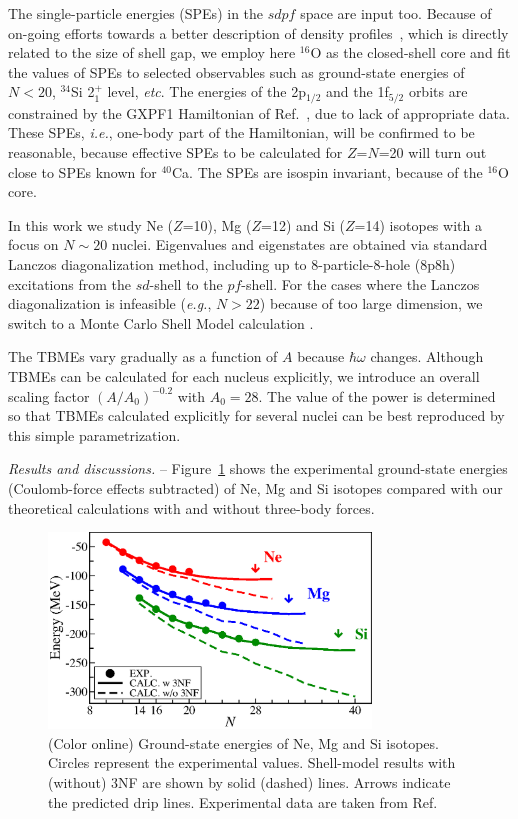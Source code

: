 \documentclass[aps,prl,twocolumn,groupedaddress,showkeys,showpacs,floatfix,superscriptaddress]{revtex4-1}
\newcommand\+{^\dagger}
\newcommand\hw{\hbar\omega}
\begin{document}
The single-particle energies (SPEs) in the $sdpf$ space are input too.  
Because of on-going efforts towards a better description of density
profiles~\cite{Ekstrom:2015gw},
which is directly related to the size of shell gap,
we employ here $^{16}$O as the closed-shell core and fit the values of SPEs to selected 
observables such as ground-state energies of $N<20$, $^{34}$Si 2$_1^+$ level, {\it etc}.  
The energies of the 2p$_{1/2}$ and the 1f$_{5/2}$ orbits are constrained
by the GXPF1 Hamiltonian of Ref.~\cite{PhysRevC.65.061301}, due to lack of 
appropriate data.
These SPEs, {\it i.e.}, one-body part of the Hamiltonian, will be confirmed to be reasonable, 
because effective SPEs to be calculated for $Z$=$N$=20 will turn out close to SPEs known for $^{40}$Ca.  
The SPEs are isospin invariant, because of the $^{16}$O core.

In this work we study Ne ($Z$=10), Mg ($Z$=12) and Si ($Z$=14) isotopes
with a focus on $N\sim20$ nuclei.
Eigenvalues and eigenstates are obtained via standard Lanczos diagonalization method, 
including up to 8-particle-8-hole (8p8h) %
excitations from the $sd$-shell to the $pf$-shell. 
For the cases where the Lanczos diagonalization is infeasible ({\it e.g.}, $N>22$) because of 
too large dimension, we switch to a Monte Carlo Shell Model calculation \cite{Otsuka:2001gx,Shimizu:2012dh}. 

The TBMEs vary gradually as a function of $A$ because $\hw$ changes.  
Although TBMEs can be calculated for each nucleus explicitly,  
we introduce an overall scaling factor $(A/A_0)^{-0.2}$ with  
$A_0=28$.  The value of the power is determined so that TBMEs calculated
explicitly for several nuclei can be best reproduced by this simple parametrization. 

{\it Results and discussions.} --
Figure~\ref{fig:GE} shows the experimental ground-state energies
(Coulomb-force effects subtracted) of Ne, Mg and Si isotopes compared
with our theoretical calculations with and without three-body forces.

\begin{figure}[tbh]
 \includegraphics[width=8.5725cm,angle=0,clip]{Fig1.eps}
 \caption{(Color online)
 Ground-state energies of Ne, Mg and Si isotopes. Circles represent the experimental
 values.   Shell-model results with (without) 3NF are shown by 
 solid (dashed) lines.
 Arrows indicate the predicted drip lines.
 Experimental data are taken from
 Ref.~\cite{NationalNuclearDataCenter:2008tv}}
 \label{fig:GE}
\end{figure}
\end{document}

